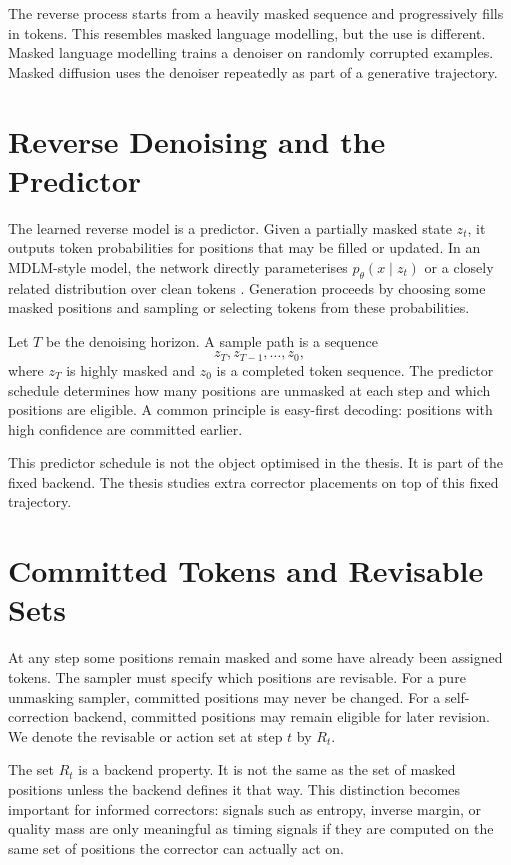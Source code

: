 The reverse process starts from a heavily masked sequence and progressively
fills in tokens. This resembles masked language modelling, but the use is
different. Masked language modelling trains a denoiser on randomly corrupted
examples. Masked diffusion uses the denoiser repeatedly as part of a generative
trajectory.

\section{Reverse Denoising and the Predictor}
\label{sec:ch3-reverse-predictor}

The learned reverse model is a predictor. Given a partially masked state
$z_t$, it outputs token probabilities for positions that may be filled or
updated. In an MDLM-style model, the network directly parameterises
$p_\theta(x \mid z_t)$ or a closely related distribution over clean tokens
\parencite{sahoo2024mdlm}. Generation proceeds by choosing some masked
positions and sampling or selecting tokens from these probabilities.

Let $T$ be the denoising horizon. A sample path is a sequence
\[
  z_T,z_{T-1},\ldots,z_0,
\]
where $z_T$ is highly masked and $z_0$ is a completed token sequence. The
predictor schedule determines how many positions are unmasked at each step and
which positions are eligible. A common principle is easy-first decoding:
positions with high confidence are committed earlier.

This predictor schedule is not the object optimised in the thesis. It is part
of the fixed backend. The thesis studies extra corrector placements on top of
this fixed trajectory.

\section{Committed Tokens and Revisable Sets}
\label{sec:ch3-revisable-sets}

At any step some positions remain masked and some have already been assigned
tokens. The sampler must specify which positions are revisable. For a pure
unmasking sampler, committed positions may never be changed. For a
self-correction backend, committed positions may remain eligible for later
revision. We denote the revisable or action set at step $t$ by $R_t$.

The set $R_t$ is a backend property. It is not the same as the set of masked
positions unless the backend defines it that way. This distinction becomes
important for informed correctors: signals such as entropy, inverse margin, or
quality mass are only meaningful as timing signals if they are computed on the
same set of positions the corrector can actually act on.

